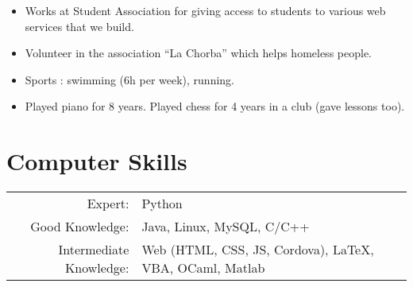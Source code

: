 \documentclass[a4paper,10pt]{article} %
\begin{document}
\begin{itemize}[noitemsep]
  \item Works at Student Association for giving access to students to various web services that we build.
  \item Volunteer in the association ``La Chorba'' which helps homeless people.
  \item Sports : swimming (6h per week), running.
  \item Played piano for 8 years. Played chess for 4 years in a club (gave lessons too).
\end{itemize}



\section{Computer Skills}

\begin{tabular}{rl}
  Expert: & Python\\
  Good Knowledge: & Java, Linux, MySQL, C/C++\\
  Intermediate Knowledge: & Web (HTML, CSS, JS, Cordova), \LaTeX, VBA, OCaml, Matlab
\end{tabular}
\end{document}
